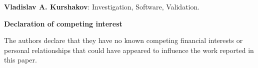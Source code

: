 \documentclass[final,3p]{elsarticle}
\begin{document}
{\bf Vladislav A. Kurshakov}: Investigation, Software, Validation.

\vspace{0.5cm}
{\bf Declaration of competing interest}


The authors declare that they have no known competing financial interests or personal relationships that could have appeared to influence the work reported in this paper.













\end{document}
